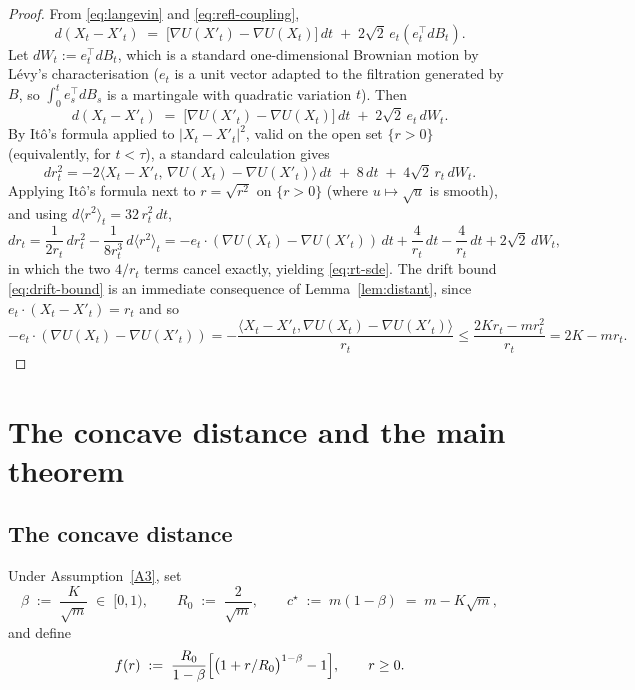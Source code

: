 \documentclass[11pt]{article}
\theoremstyle{definition}
\newcommand{\abs}[1]{\left\lvert #1 \right\rvert}
\begin{document}
\begin{proof}
From \eqref{eq:langevin} and \eqref{eq:refl-coupling},
\[
d(X_t - X'_t) \;=\; \bigl[\nabla U(X'_t) - \nabla U(X_t)\bigr]\,dt \;+\; 2\sqrt 2\, e_t (e_t^\top dB_t).
\]
Let $dW_t := e_t^\top dB_t$, which is a standard one-dimensional Brownian motion by L\'evy's characterisation ($e_t$ is a unit vector adapted to the filtration generated by $B$, so $\int_0^t e_s^\top dB_s$ is a martingale with quadratic variation $t$). Then
\[
d(X_t - X'_t) \;=\; \bigl[\nabla U(X'_t) - \nabla U(X_t)\bigr]\,dt \;+\; 2\sqrt 2\, e_t\,dW_t.
\]
By It\^o's formula applied to $\abs{X_t - X'_t}^2$, valid on the open set $\{r > 0\}$ (equivalently, for $t < \tau$), a standard calculation gives
\[
d r_t^2 = -2\langle X_t - X'_t,\, \nabla U(X_t) - \nabla U(X'_t)\rangle\,dt \;+\; 8\,dt \;+\; 4\sqrt 2\, r_t \,dW_t.
\]
Applying It\^o's formula next to $r = \sqrt{r^2}$ on $\{r > 0\}$ (where $u \mapsto \sqrt u$ is smooth), and using $d\langle r^2\rangle_t = 32\, r_t^2\, dt$,
\[
dr_t = \frac{1}{2 r_t}\,dr_t^2 - \frac{1}{8 r_t^3}\,d\langle r^2\rangle_t = -e_t \cdot (\nabla U(X_t) - \nabla U(X'_t))\,dt + \frac{4}{r_t}\,dt - \frac{4}{r_t}\,dt + 2\sqrt 2\,dW_t,
\]
in which the two $4/r_t$ terms cancel exactly, yielding \eqref{eq:rt-sde}. The drift bound \eqref{eq:drift-bound} is an immediate consequence of Lemma~\ref{lem:distant}, since $e_t \cdot (X_t - X'_t) = r_t$ and so
\[
-e_t \cdot (\nabla U(X_t) - \nabla U(X'_t)) = -\frac{\langle X_t - X'_t, \nabla U(X_t) - \nabla U(X'_t)\rangle}{r_t} \le \frac{2K r_t - m r_t^2}{r_t} = 2K - m r_t.
\]
\end{proof}

\section{The concave distance and the main theorem}\label{sec:main}

\subsection{The concave distance}

Under Assumption~\ref{A3}, set
\begin{equation}\label{eq:params}
\beta \;:=\; \frac{K}{\sqrt m} \;\in\;[0,1), \qquad R_0 \;:=\; \frac{2}{\sqrt m}, \qquad c^\star \;:=\; m(1-\beta) \;=\; m - K\sqrt m,
\end{equation}
and define
\begin{equation}\label{eq:fdef}
f(r) \;:=\; \frac{R_0}{1-\beta}\Bigl[\bigl(1 + r/R_0\bigr)^{1-\beta} - 1\Bigr], \qquad r \ge 0.
\end{equation}
\end{document}

